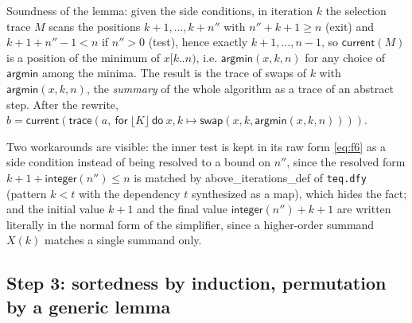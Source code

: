 \documentclass[11pt,a4paper]{article}
\newcommand{\bl}[1]{\lfloor #1\rfloor}                       %
\newcommand{\tr}[3]{\mathsf{trace}(#1,\ \mathsf{for}\ #2\ \mathsf{do}\ #3)}
\newcommand{\cur}{\mathsf{current}}
\newcommand{\intf}{\mathsf{integer}}
\newcommand{\argmin}{\mathsf{argmin}}
\newcommand{\swap}[3]{\mathsf{swap}(#1, #2, #3)}
\newcommand{\lemma}[1]{\textsf{#1}}
\begin{document}
Soundness of the lemma: given the side conditions, in iteration $k$ the selection trace $M$ scans the
positions $k + 1, \ldots, k + n''$ with $n'' + k + 1 \ge n$ (exit) and $k + 1 + n'' - 1 < n$ if $n'' > 0$
(test), hence exactly $k + 1, \ldots, n - 1$, so $\cur(M)$ is a position of the minimum of $x[k..n)$,
i.e. $\argmin(x, k, n)$ for any choice of $\argmin$ among the minima. The result is the trace of swaps of
$k$ with $\argmin(x, k, n)$, the \emph{summary} of the whole algorithm as a trace of an abstract step.
After the rewrite, $b = \cur(\tr{a}{\bl{K}}{x, k \mapsto \swap{x}{k}{\argmin(x, k, n)}})$.

Two workarounds are visible: the inner test is kept in its raw form \eqref{eq:f6} as a side condition
instead of being resolved to a bound on $n''$, since the resolved form $k + 1 + \intf(n'') \le n$ is
matched by \lemma{above\_iterations\_def} of \texttt{teq.dfy} (pattern $k < t$ with the dependency $t$
synthesized as a map), which hides the fact; and the initial value $k + 1$ and the final value
$\intf(n'') + k + 1$ are written literally in the normal form of the simplifier, since a higher-order
summand $X(k)$ matches a single summand only.

\subsection{Step 3: sortedness by induction, permutation by a generic lemma}\label{sec:sel:ind}
\end{document}
